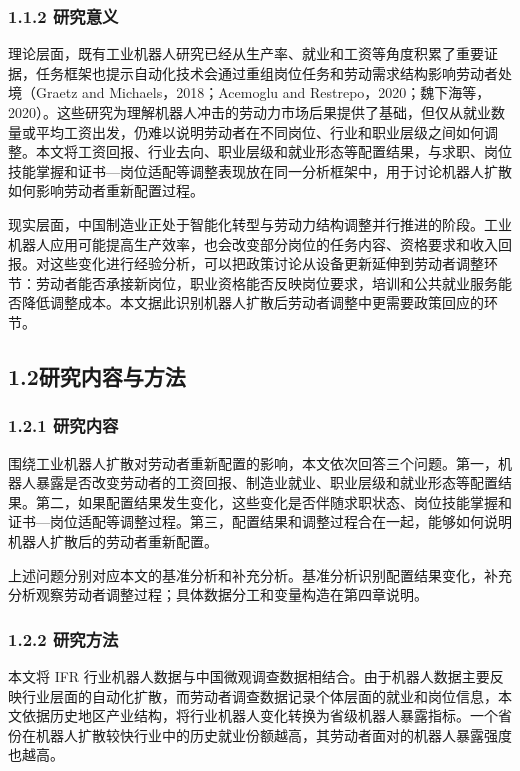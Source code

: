 \subsubsection{1.1.2 研究意义}\label{ux7814ux7a76ux610fux4e49}

理论层面，既有工业机器人研究已经从生产率、就业和工资等角度积累了重要证据，任务框架也提示自动化技术会通过重组岗位任务和劳动需求结构影响劳动者处境（Graetz and Michaels，2018；Acemoglu and Restrepo，2020；魏下海等，2020）。这些研究为理解机器人冲击的劳动力市场后果提供了基础，但仅从就业数量或平均工资出发，仍难以说明劳动者在不同岗位、行业和职业层级之间如何调整。本文将工资回报、行业去向、职业层级和就业形态等配置结果，与求职、岗位技能掌握和证书---岗位适配等调整表现放在同一分析框架中，用于讨论机器人扩散如何影响劳动者重新配置过程。

现实层面，中国制造业正处于智能化转型与劳动力结构调整并行推进的阶段。工业机器人应用可能提高生产效率，也会改变部分岗位的任务内容、资格要求和收入回报。对这些变化进行经验分析，可以把政策讨论从设备更新延伸到劳动者调整环节：劳动者能否承接新岗位，职业资格能否反映岗位要求，培训和公共就业服务能否降低调整成本。本文据此识别机器人扩散后劳动者调整中更需要政策回应的环节。

\subsection{1.2研究内容与方法}\label{ux7814ux7a76ux5185ux5bb9ux4e0eux65b9ux6cd5}

\subsubsection{1.2.1 研究内容}\label{ux7814ux7a76ux5185ux5bb9}

围绕工业机器人扩散对劳动者重新配置的影响，本文依次回答三个问题。第一，机器人暴露是否改变劳动者的工资回报、制造业就业、职业层级和就业形态等配置结果。第二，如果配置结果发生变化，这些变化是否伴随求职状态、岗位技能掌握和证书---岗位适配等调整过程。第三，配置结果和调整过程合在一起，能够如何说明机器人扩散后的劳动者重新配置。

上述问题分别对应本文的基准分析和补充分析。基准分析识别配置结果变化，补充分析观察劳动者调整过程；具体数据分工和变量构造在第四章说明。

\subsubsection{1.2.2 研究方法}\label{ux7814ux7a76ux65b9ux6cd5}

本文将 IFR 行业机器人数据与中国微观调查数据相结合。由于机器人数据主要反映行业层面的自动化扩散，而劳动者调查数据记录个体层面的就业和岗位信息，本文依据历史地区产业结构，将行业机器人变化转换为省级机器人暴露指标。一个省份在机器人扩散较快行业中的历史就业份额越高，其劳动者面对的机器人暴露强度也越高。

